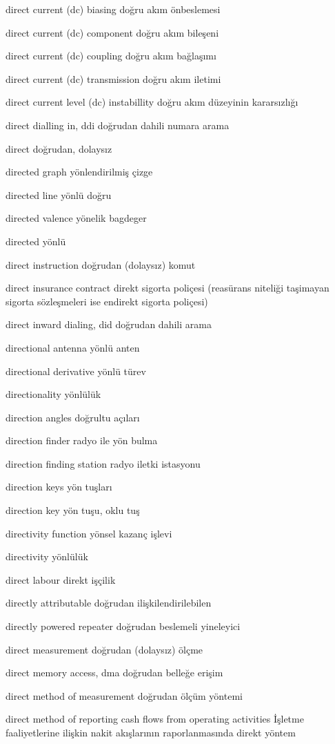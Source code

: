 \documentclass[12pt,fleqn]{article}\usepackage{../../common}
\begin{document}
direct current (dc) biasing doğru akım önbeslemesi

direct current (dc) component doğru akım bileşeni

direct current (dc) coupling doğru akım bağlaşımı

direct current (dc) transmission doğru akım iletimi

direct current level (dc) instabillity doğru akım düzeyinin kararsızlığı

direct dialling in, ddi doğrudan dahili numara arama

direct doğrudan, dolaysız

directed graph yönlendirilmiş çizge

directed line yönlü doğru

directed valence yönelik bagdeger

directed yönlü

direct instruction doğrudan (dolaysız) komut

direct insurance contract direkt sigorta poliçesi (reasürans niteliği taşimayan sigorta sözleşmeleri ise endirekt sigorta poliçesi)

direct inward dialing, did doğrudan dahili arama

directional antenna yönlü anten

directional derivative yönlü türev

directionality yönlülük

direction angles doğrultu açıları

direction finder radyo ile yön bulma

direction finding station radyo iletki istasyonu

direction keys yön tuşları

direction key yön tuşu, oklu tuş

directivity function yönsel kazanç işlevi

directivity yönlülük

direct labour direkt işçilik

directly attributable doğrudan ilişkilendirilebilen

directly powered repeater doğrudan beslemeli yineleyici

direct measurement doğrudan (dolaysız) ölçme

direct memory access, dma doğrudan belleğe erişim

direct method of measurement doğrudan ölçüm yöntemi

direct method of reporting cash flows from operating activities İşletme faaliyetlerine ilişkin nakit akışlarının raporlanmasında direkt yöntem
\end{document}
